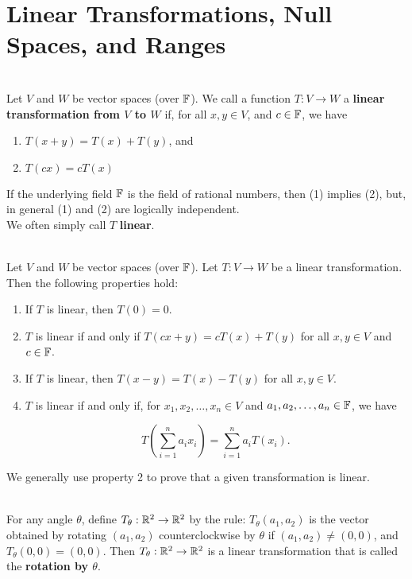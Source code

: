 \section{Linear Transformations, Null Spaces, and Ranges}

\begin{definition}
	\hfill\\
	Let $V$ and $W$ be vector spaces (over $\mathbb{F}$). We call a function $T: V \to W$ a \textbf{linear transformation from $V$ to $W$} if, for all $x,y \in V$, and $c \in \mathbb{F}$, we have
	
	\begin{enumerate}
		\item $T(x + y) = T(x) + T(y)$, and
		\item $T(cx) = cT(x)$
	\end{enumerate}
	
	If the underlying field $\mathbb{F}$ is the field of rational numbers, then (1) implies (2), but, in general (1) and (2) are logically independent.\\
	
	We often simply call $T$ \textbf{linear}.
\end{definition}

\begin{remark}
	\hfill\\
	Let $V$ and $W$ be vector spaces (over $\mathbb{F}$). Let $T: V \to W$ be a linear transformation. Then the following properties hold:
	
	\begin{enumerate}
		\item If $T$ is linear, then $T(0) = 0$.
		\item $T$ is linear if and only if $T(cx + y) = cT(x) + T(y)$ for all $x,y \in V$ and $c \in \mathbb{F}$.
		\item If $T$ is linear, then $T(x-y)=T(x)-T(y)$ for all $x,y \in V$.
		\item $T$ is linear if and only if, for $x_1, x_2, \dots, x_n \in V$ and $a_1, a_2, \dots, a_n \in \mathbb{F}$, we have
		
		\[T\left(\sum_{i=1}^{n}a_ix_i\right)=\sum_{i=1}^{n}a_iT(x_i).\]
	\end{enumerate}
	
	We generally use property 2 to prove that a given transformation is linear.
\end{remark}

\begin{definition}
	\hfill\\
	For any angle $\theta$, define $T_\theta: \mathbb{R}^2 \to \mathbb{R}^2$ by the rule: $T_\theta(a_1, a_2)$ is the vector obtained by rotating $(a_1, a_2)$ counterclockwise by $\theta$ if $(a_1, a_2) \neq (0, 0)$, and $T_\theta(0,0) = (0,0)$. Then $T_\theta: \mathbb{R}^2 \to \mathbb{R}^2$ is a linear transformation that is called the \textbf{rotation by $\theta$}.
\end{definition}

